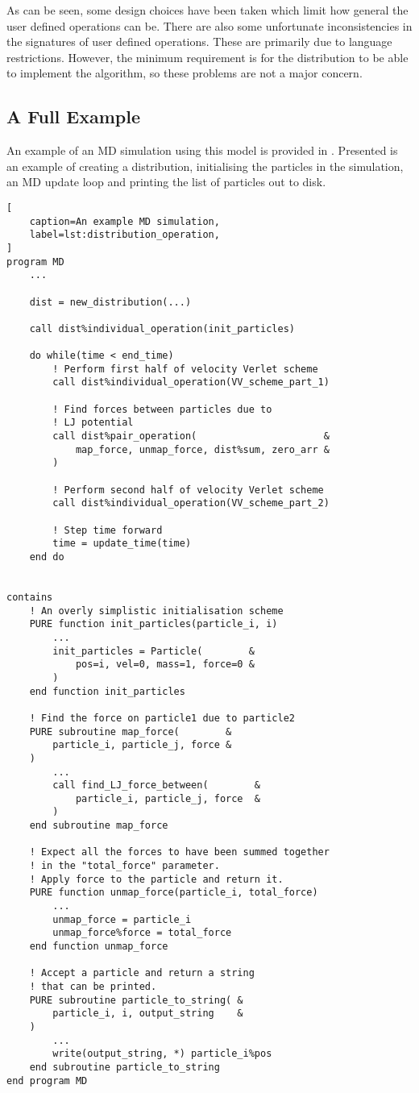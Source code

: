 As can be seen, some design choices have been taken which limit how
general the user defined operations can be.
%
There are also some unfortunate inconsistencies in the signatures of
user defined operations.
%
These are primarily due to language restrictions.
%
However, the minimum requirement is for the distribution to be able
to implement the \velocityverlet{} algorithm,
so these problems are not a major concern.


\subsection{A Full Example}

An example of an MD simulation using this model is provided in
.
%
Presented is an example of creating a distribution,
initialising the particles in the simulation,
an MD update loop and
printing the list of particles out to disk.


\begin{lstlisting}[
    caption=An example MD simulation,
    label=lst:distribution_operation,
]
program MD
    ...

    dist = new_distribution(...)

    call dist%individual_operation(init_particles)

    do while(time < end_time)
        ! Perform first half of velocity Verlet scheme
        call dist%individual_operation(VV_scheme_part_1)

        ! Find forces between particles due to
        ! LJ potential
        call dist%pair_operation(                      &
            map_force, unmap_force, dist%sum, zero_arr &
        )

        ! Perform second half of velocity Verlet scheme
        call dist%individual_operation(VV_scheme_part_2)

        ! Step time forward
        time = update_time(time)
    end do


contains
    ! An overly simplistic initialisation scheme
    PURE function init_particles(particle_i, i)
        ...
        init_particles = Particle(        &
            pos=i, vel=0, mass=1, force=0 &
        )
    end function init_particles

    ! Find the force on particle1 due to particle2
    PURE subroutine map_force(        &
        particle_i, particle_j, force &
    )
        ...
        call find_LJ_force_between(        &
            particle_i, particle_j, force  &
        )
    end subroutine map_force

    ! Expect all the forces to have been summed together
    ! in the "total_force" parameter.
    ! Apply force to the particle and return it.
    PURE function unmap_force(particle_i, total_force)
        ...
        unmap_force = particle_i
        unmap_force%force = total_force
    end function unmap_force

    ! Accept a particle and return a string
    ! that can be printed.
    PURE subroutine particle_to_string( &
        particle_i, i, output_string    &
    )
        ...
        write(output_string, *) particle_i%pos
    end subroutine particle_to_string
end program MD
\end{lstlisting}


